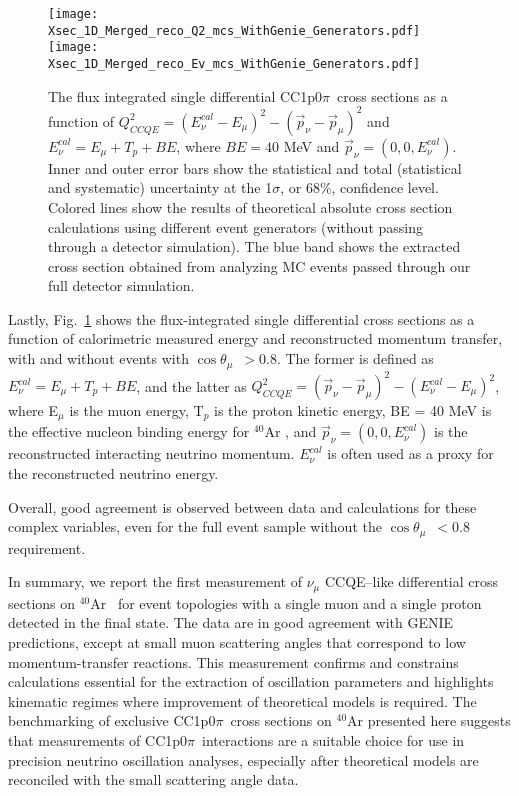 \documentclass[aps,prl,showpacs,twocolumn,superscriptaddress,letterpaper,longbibliography]{revtex4-1}
\newcommand{\CCIpOpi}{CC1p0$\pi$}
\newcommand{\CosThetaMu}{$\cos\theta_{\mu}$}
\newcommand{\argon}{$^{40}$Ar\,\,}
\begin{document}
    \begin{figure}[t]
		\centering  
 		\texttt{[image: Xsec\_1D\_Merged\_reco\_Q2\_mcs\_WithGenie\_Generators.pdf]}
 		\texttt{[image: Xsec\_1D\_Merged\_reco\_Ev\_mcs\_WithGenie\_Generators.pdf]} 		
		\caption{The flux integrated single differential \CCIpOpi\ cross sections as a function of 
		$Q^{2}_{CCQE}  = (E^{cal}_{\nu} - E_{\mu})^{2} - (\vec{p}_{\nu} - \vec{p}_{\mu})^{2}$ and $E_{\nu}^{cal}  = E_{\mu} + T_{p} + BE$, 
		where $BE =  40$ MeV and $\vec{p}_{\nu} = (0, 0, E^{cal}_{\nu})$. 
		Inner and outer error bars show the statistical and total (statistical and systematic) uncertainty at the 1$\sigma$, or 68\%, confidence level. 
		Colored lines show the results of theoretical absolute cross section calculations using different event generators (without passing through a detector simulation). 
		The blue band shows the extracted cross section obtained from analyzing MC events passed through our full detector simulation.}
		\label{fig:Xsec_1D_Ev_Q2}
	\end{figure}




Lastly, Fig.~\ref{fig:Xsec_1D_Ev_Q2} shows the flux-integrated single differential cross sections as a function of calorimetric measured energy and reconstructed momentum transfer, 
with and 
without events with \CosThetaMu\ $> 0.8$. The former is defined as $E_{\nu}^{cal} = E_{\mu} + T_{p} + BE$, and the latter as 
$Q^{2}_{CCQE} = (\vec{p}_{\nu} - \vec{p}_{\mu})^{2} - (E^{cal}_{\nu} - E_{\mu})^{2}$, where E$_{\mu}$ is the muon energy, T$_{p}$ is the proton kinetic energy, BE = 40 MeV 
is the effective 
nucleon binding energy for \argon{}, and $\vec{p}_{\nu} = (0, 0, E^{cal}_{\nu})$ is the reconstructed interacting neutrino momentum. 
$E_{\nu}^{cal}$ is often used as a proxy for the reconstructed neutrino energy.  

Overall, good agreement is observed between data and calculations for these complex variables, even for the full event sample without the   \CosThetaMu\ $ < 0.8$  requirement.


In summary, 
we report the first measurement of $\nu_\mu$ CCQE--like differential cross sections on \argon\ 
for event topologies with a single muon and a single proton detected in the final state.
The data are in good agreement with GENIE predictions, except at small 
muon scattering angles that correspond to low momentum-transfer reactions.
This measurement confirms and constrains calculations essential for the extraction of oscillation 
parameters and highlights kinematic regimes where improvement of theoretical models is required.
The benchmarking of exclusive \CCIpOpi\ cross sections on \argon presented here suggests that
measurements of \CCIpOpi\ interactions are a suitable choice for use in precision neutrino 
oscillation analyses, especially after theoretical models are reconciled with the small scattering angle data.
	
\end{document}
